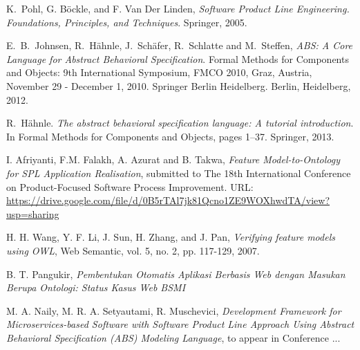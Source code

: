 \documentclass[conference]{IEEEtran}
\begin{document}
%
%
%
\begin{thebibliography}{1}


K.~Pohl, G. B\"{o}ckle, and F. Van Der Linden, \textit{Software Product Line Engineering. Foundations, Principles, and Techniques}. Springer, 2005.

E.~B.~Johnsen, R.~H\"{a}hnle, J.~Sch\"{a}fer, R.~Schlatte and M.~Steffen, \textit{ABS: A Core Language for Abstract Behavioral Specification}. Formal Methods for Components and Objects: 9th International Symposium, FMCO 2010, Graz, Austria, November 29 - December 1, 2010. Springer Berlin Heidelberg. Berlin, Heidelberg, 2012. 

R.~H\"{a}hnle. \textit{The abstract behavioral specification language: A tutorial introduction}.
In Formal Methods for Components and Objects, pages 1–37. Springer, 2013.

I. Afriyanti, F.M. Falakh, A. Azurat and B. Takwa, \textit{Feature Model-to-Ontology for SPL Application Realisation}, submitted to The 18th International Conference on Product-Focused Software Process Improvement. URL: \url{https://drive.google.com/file/d/0B5rTAl7jk81Qcno1ZE9WOXhwdTA/view?usp=sharing}

H. H. Wang, Y. F. Li, J. Sun, H. Zhang, and J. Pan, \textit{Verifying feature models using OWL}, Web Semantic, vol. 5, no. 2, pp. 117-129, 2007.


B. T. Pangukir, \textit{Pembentukan Otomatis Aplikasi Berbasis Web dengan Masukan Berupa Ontologi: Status Kasus Web BSMI}

M. A. Naily, M. R. A. Setyautami, R. Muschevici, \textit{Development Framework for Microservices-based Software with Software Product Line Approach Using Abstract Behavioral Specification (ABS) Modeling Language}, to appear in Conference ...

\end{thebibliography}


\end{document}
